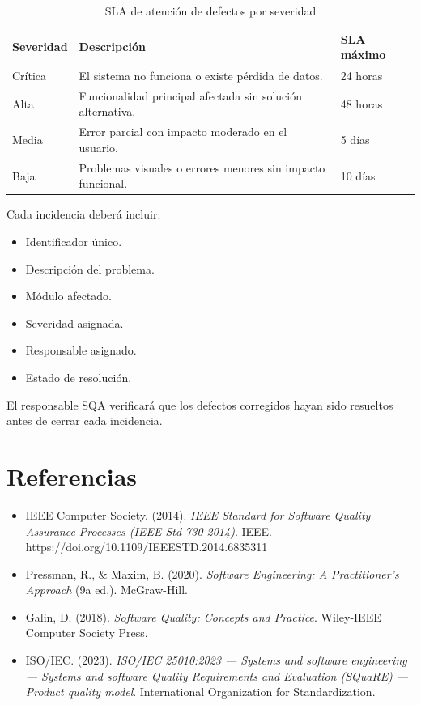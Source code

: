 \documentclass[12pt,a4paper]{article}
\begin{document}
\begin{table}[H]
\centering
\begin{tabular}{|p{3cm}|p{6cm}|p{3cm}|}
\hline
\textbf{Severidad} & \textbf{Descripción} & \textbf{SLA máximo} \\
\hline
Crítica & El sistema no funciona o existe pérdida de datos. & 24 horas \\
\hline
Alta & Funcionalidad principal afectada sin solución alternativa. & 48 horas \\
\hline
Media & Error parcial con impacto moderado en el usuario. & 5 días \\
\hline
Baja & Problemas visuales o errores menores sin impacto funcional. & 10 días \\
\hline
\end{tabular}
\caption{SLA de atención de defectos por severidad}
\end{table}

Cada incidencia deberá incluir:

\begin{itemize}
    \item Identificador único.
    \item Descripción del problema.
    \item Módulo afectado.
    \item Severidad asignada.
    \item Responsable asignado.
    \item Estado de resolución.
\end{itemize}

El responsable SQA verificará que los defectos corregidos hayan sido resueltos antes de cerrar cada incidencia.


\section{Referencias}

\begin{itemize}
    \item IEEE Computer Society. (2014). \textit{IEEE Standard for Software Quality Assurance Processes (IEEE Std 730-2014)}. IEEE. https://doi.org/10.1109/IEEESTD.2014.6835311
    
    \item Pressman, R., \& Maxim, B. (2020). \textit{Software Engineering: A Practitioner's Approach} (9a ed.). McGraw-Hill.
    
    \item Galin, D. (2018). \textit{Software Quality: Concepts and Practice}. Wiley-IEEE Computer Society Press.
    
    \item ISO/IEC. (2023). \textit{ISO/IEC 25010:2023 — Systems and software engineering — Systems and software Quality Requirements and Evaluation (SQuaRE) — Product quality model}. International Organization for Standardization.
\end{itemize}
\end{document}
